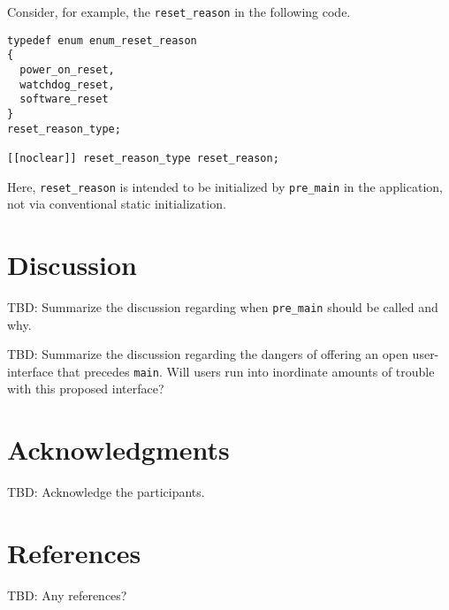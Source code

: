 \documentclass[11pt]{article}
\begin{document}
Consider, for example, the \lstinline{reset_reason} in
the following code.

\begin{lstlisting}
typedef enum enum_reset_reason
{
  power_on_reset,
  watchdog_reset,
  software_reset
}
reset_reason_type;

[[noclear]] reset_reason_type reset_reason;
\end{lstlisting}

\noindent
Here, \lstinline{reset_reason} is intended to be initialized by
\lstinline{pre_main} in the application, not via conventional
static initialization.

\section{Discussion}

TBD: Summarize the discussion regarding when \lstinline{pre_main}
should be called and why.

TBD: Summarize the discussion regarding the dangers of
offering an open user-interface that precedes \lstinline{main}.
Will users run into inordinate amounts of trouble with this
proposed interface?

\section{Acknowledgments}

TBD: Acknowledge the participants.

\section{References}
\renewcommand{\section}[2]{}%
\begin{thebibliography}{9}

TBD: Any references?


\end{thebibliography}
\end{document}
